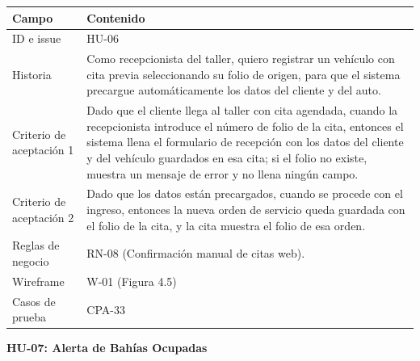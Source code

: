 {\def\LTcaptype{none} %
\begin{longtable}[]{@{}
  >{\raggedright\arraybackslash}p{}
  >{\raggedright\arraybackslash}p{}@{}}
\toprule\noalign{}
\begin{minipage}[b]{\linewidth}\raggedright
\textbf{Campo}
\end{minipage} & \begin{minipage}[b]{\linewidth}\raggedright
\textbf{Contenido}
\end{minipage} \\
\midrule\noalign{}
\endhead
\bottomrule\noalign{}
\endlastfoot
ID e issue & HU-06 \\
Historia & Como recepcionista del taller, quiero registrar un vehículo
con cita previa seleccionando su folio de origen, para que el sistema
precargue automáticamente los datos del cliente y del auto. \\
Criterio de aceptación 1 & Dado que el cliente llega al taller con cita
agendada, cuando la recepcionista introduce el número de folio de la
cita, entonces el sistema llena el formulario de recepción con los
datos del cliente y del vehículo guardados en esa cita; si el folio no
existe, muestra un mensaje de error y no llena ningún campo. \\
Criterio de aceptación 2 & Dado que los datos están precargados, cuando
se procede con el ingreso, entonces la nueva orden de servicio queda
guardada con el folio de la cita, y la cita muestra el folio de esa
orden. \\
Reglas de negocio & RN-08 (Confirmación manual de citas web). \\
Wireframe & W-01 (Figura 4.5) \\
Casos de prueba & CPA-33 \\
\end{longtable}
}

\textbf{HU-07: Alerta de Bahías Ocupadas}


